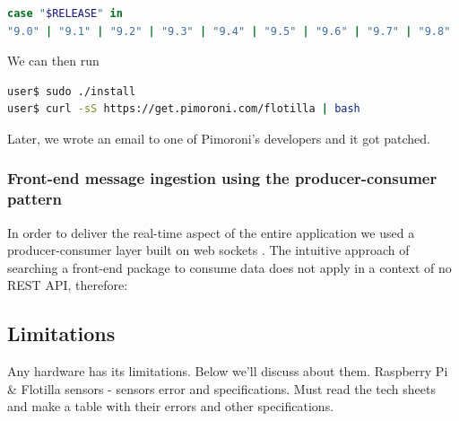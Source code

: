 \begin{lstlisting}[language=bash]
case "$RELEASE" in
"9.0" | "9.1" | "9.2" | "9.3" | "9.4" | "9.5" | "9.6" | "9.7" | "9.8" | "9.9" | "10")
\end{lstlisting}

\hspace{-6mm}We can then run 

\begin{lstlisting}[language=bash]
user$ sudo ./install
user$ curl -sS https://get.pimoroni.com/flotilla | bash
\end{lstlisting}

\hspace{-6mm} Later, we wrote an email to one of Pimoroni's developers and it got patched.

\subsubsection{Front-end message ingestion using the producer-consumer pattern}

In order to deliver the real-time aspect of the entire application we used a producer-consumer layer built on web sockets \cite{ws}. The intuitive approach of searching a front-end package to consume data does not apply in a context of no REST API, therefore:
\begin{table}[!htb]
  \begin{center}
    \label{tab:table10}
  \end{center}
\end{table}

\subsection{Limitations}

Any hardware has its limitations. Below we'll discuss about them. Raspberry Pi \& Flotilla sensors - sensors error and specifications. Must read the tech sheets and make a table with their errors and other specifications.

